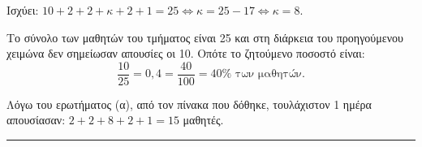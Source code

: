 \begin{alist}
    \item Ισχύει: $10+2+2+\kappa+2+1=25 \Leftrightarrow \kappa = 25-17 \Leftrightarrow \kappa=8$.
    \item Το σύνολο των μαθητών του τμήματος είναι 25 και στη διάρκεια του προηγούμενου χειμώνα δεν σημείωσαν απουσίες οι 10. Οπότε το ζητούμενο ποσοστό είναι:
    \[ \frac{10}{25} = 0,4 = \frac{40}{100} = 40\% \text{ των μαθητών.} \]
    \item Λόγω του ερωτήματος (α), από τον πίνακα που δόθηκε, τουλάχιστον 1 ημέρα απουσίασαν: $2+2+8+2+1=15$ μαθητές.
\end{alist}
\vspace{6mm}
\noindent\rule{\textwidth}{0.4pt}
\vspace{6mm}

